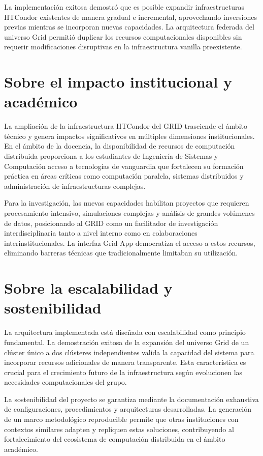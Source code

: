 La implementación exitosa demostró que es posible expandir infraestructuras HTCondor existentes de manera gradual e incremental, aprovechando inversiones previas mientras se incorporan nuevas capacidades. La arquitectura federada del universo Grid permitió duplicar los recursos computacionales disponibles sin requerir modificaciones disruptivas en la infraestructura vanilla preexistente.

\section{Sobre el impacto institucional y académico}
\noindent

La ampliación de la infraestructura HTCondor del GRID trasciende el ámbito técnico y genera impactos significativos en múltiples dimensiones institucionales. En el ámbito de la docencia, la disponibilidad de recursos de computación distribuida proporciona a los estudiantes de Ingeniería de Sistemas y Computación acceso a tecnologías de vanguardia que fortalecen su formación práctica en áreas críticas como computación paralela, sistemas distribuidos y administración de infraestructuras complejas.

Para la investigación, las nuevas capacidades habilitan proyectos que requieren procesamiento intensivo, simulaciones complejas y análisis de grandes volúmenes de datos, posicionando al GRID como un facilitador de investigación interdisciplinaria tanto a nivel interno como en colaboraciones interinstitucionales. La interfaz Grid App democratiza el acceso a estos recursos, eliminando barreras técnicas que tradicionalmente limitaban su utilización.

\section{Sobre la escalabilidad y sostenibilidad}
\noindent

La arquitectura implementada está diseñada con escalabilidad como principio fundamental. La demostración exitosa de la expansión del universo Grid de un clúster único a dos clústeres independientes valida la capacidad del sistema para incorporar recursos adicionales de manera transparente. Esta característica es crucial para el crecimiento futuro de la infraestructura según evolucionen las necesidades computacionales del grupo.

La sostenibilidad del proyecto se garantiza mediante la documentación exhaustiva de configuraciones, procedimientos y arquitecturas desarrolladas. La generación de un marco metodológico reproducible permite que otras instituciones con contextos similares adapten y repliquen estas soluciones, contribuyendo al fortalecimiento del ecosistema de computación distribuida en el ámbito académico.

